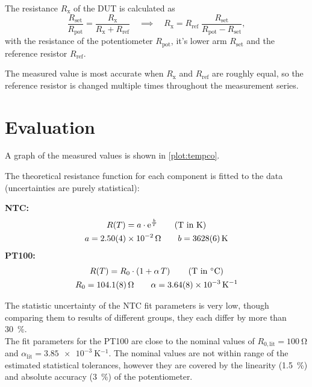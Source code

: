 The resistance $R_\text{x}$ of the DUT is calculated as
\begin{equation*}
	\frac{R_\text{set}}{R_\text{pot}} = \frac{R_\text{x}}{R_\text{x} + R_\text{ref}}
	\quad \implies \quad R_\text{x} = R_\text{ref} \; \frac{R_\text{set}}{R_\text{pot} - R_\text{set}},
\end{equation*}
with the resistance of the potentiometer $R_\text{pot}$, it's lower arm $R_\text{set}$ and the reference resistor $R_\text{ref}$.

The measured value is most accurate when $R_\text{x}$ and $R_\text{ref}$ are roughly equal, so the reference resistor is changed multiple times throughout the measurement series.

\section{Evaluation}

A graph of the measured values is shown in \autoref{plot:tempco}.

The theoretical resistance function for each component is fitted to the data (uncertainties are purely statistical):

\textbf{NTC:}
\begin{gather*}
	R(T) = a \cdot \mathrm{e}^{\frac{b}{T}} \tag*{(T in \si{\kelvin})}\\
	a = \SI{2.50(4)e-2}{\ohm}	\qquad	b = \SI{3628(6)}{\kelvin}
\end{gather*}
\textbf{PT100:}
\begin{gather*}
	R(T) = R_0 \cdot \left(1 + \alpha \, T \right) \tag*{(T in \si{\celsius})}\\
	R_0 = \SI{104.1(8)}{\ohm}	\qquad	\alpha = \SI{3.64(8)e-3}{\kelvin^{-1}}
\end{gather*}

The statistic uncertainty of the NTC fit parameters is very low, though comparing them to results of different groups, they each differ by more than \SI{30}{\percent}.\\
The fit parameters for the PT100 are close to the nominal values of $R_{0,\text{lit}} = \SI{100}{\ohm}$ and $\alpha_\text{lit} = \SI{3.85e-3}{\kelvin^{-1}}$.
The nominal values are not within range of the estimated statistical tolerances, however they are covered by the linearity (\SI{1.5}{\percent}) and absolute accuracy (\SI{3}{\percent}) of the potentiometer.

